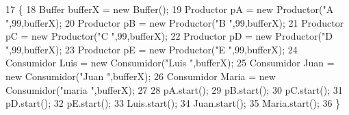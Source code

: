 \begin{DoxyCode}
17     \{
18         Buffer bufferX = \textcolor{keyword}{new} Buffer();
19         Productor pA = \textcolor{keyword}{new} Productor(\textcolor{stringliteral}{"A "},99,bufferX);
20         Productor pB = \textcolor{keyword}{new} Productor(\textcolor{stringliteral}{"B "},99,bufferX);
21         Productor pC = \textcolor{keyword}{new} Productor(\textcolor{stringliteral}{"C "},99,bufferX);
22         Productor pD = \textcolor{keyword}{new} Productor(\textcolor{stringliteral}{"D "},99,bufferX);
23         Productor pE = \textcolor{keyword}{new} Productor(\textcolor{stringliteral}{"E "},99,bufferX);
24         Consumidor Luis = \textcolor{keyword}{new} Consumidor(\textcolor{stringliteral}{"Luis "},bufferX);
25         Consumidor Juan = \textcolor{keyword}{new} Consumidor(\textcolor{stringliteral}{"Juan "},bufferX);
26         Consumidor Maria = \textcolor{keyword}{new} Consumidor(\textcolor{stringliteral}{"maria "},bufferX);
27         
28         pA.start();
29         pB.start();
30         pC.start();
31         pD.start();
32         pE.start();
33         Luis.start();
34         Juan.start();
35         Maria.start();
36     \}
\end{DoxyCode}
